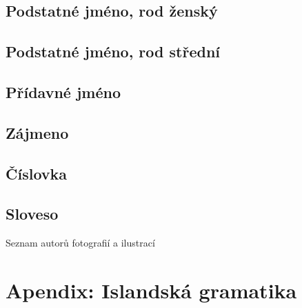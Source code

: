 \section{Podstatné jméno, rod ženský}            \label{sec:morpho_f}
{\small{}}


\section{Podstatné jméno, rod střední}           \label{sec:morpho_n}
{\small{}}


\section{Přídavné jméno}                         \label{sec:morpho_adj}
{\small{}}


\section{Zájmeno}                                \label{sec:morpho_pron}


\section{Číslovka}                               \label{sec:morpho_num}
{\small{}}

\section{Sloveso}                                \label{sec:morpho_v}




\cleardoublepage
{}
  {Seznam autorů fotografií a ilustrací}         \label{sec:photo}
\printindex

\cleardoublepage
\twocolumn
{}
{}
\nocite{*}
\printbibliography

\onecolumn
\pagestyle{empty}

\chapter{Apendix: Islandská gramatika}
%

\cleardoublepage\null\clearpage %
\vfill
\EANisbn[SC3]

\cleardoublepage\null\clearpage %
\makecover\backcoverimages


